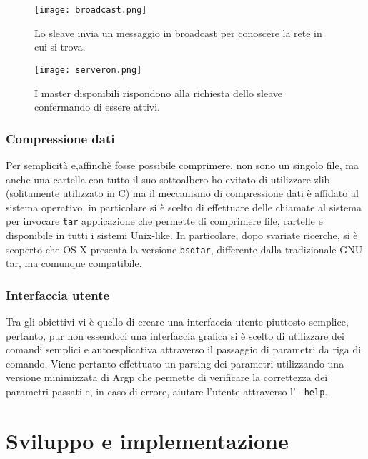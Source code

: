 \documentclass[11pt,fleqn]{book} %
\begin{document}
\begin{figure}[h]
	\centering
    \texttt{[image: broadcast.png]}
    \caption{Lo sleave invia un messaggio in broadcast per conoscere la rete in cui si trova.}
    \label{fig:awesome_image}
	\centering
    \texttt{[image: serveron.png]}
    \caption{I master disponibili rispondono alla richiesta dello sleave confermando di essere attivi.}
    \label{fig:awesome_image}
\end{figure}






\subsection{Compressione dati}\label{Compressione}
Per semplicità e,affinchè fosse possibile comprimere, non sono un singolo file, ma anche una cartella con tutto il suo sottoalbero ho evitato di utilizzare  zlib (solitamente utilizzato in C) ma il meccanismo di  compressione dati è affidato al sistema operativo, in particolare si è scelto di effettuare delle chiamate al sistema per invocare \texttt{tar} applicazione che permette di comprimere file, cartelle e disponibile in tutti i sistemi Unix-like.
In particolare, dopo svariate ricerche, si è scoperto che OS X presenta la versione \texttt{bsdtar}, differente dalla tradizionale GNU tar, ma comunque compatibile.

\subsection{Interfaccia utente}
Tra gli obiettivi vi è quello di creare una interfaccia utente piuttosto semplice, pertanto, pur non essendoci una interfaccia grafica si è scelto di utilizzare dei comandi semplici e autoesplicativa attraverso il passaggio di parametri da riga di comando.
Viene pertanto effettuato un parsing dei parametri utilizzando una versione minimizzata di Argp che permette di verificare la correttezza dei parametri passati e, in caso di errore, aiutare l'utente attraverso l' \texttt{---help}.


\chapter{Sviluppo e implementazione}
\end{document}

